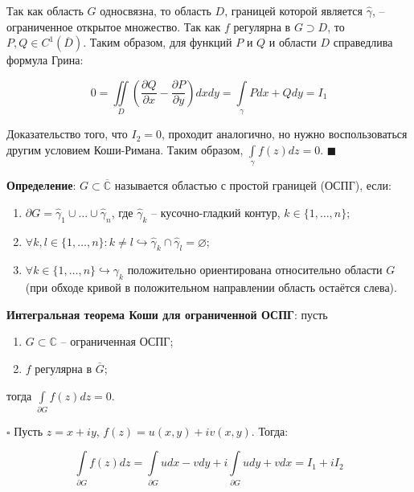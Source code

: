 \documentclass[12pt, a4paper, reqno]{article}
\begin{document}
    Так как область $G$ односвязна, то область $D$, границей которой является $\hat{\gamma}$, --
    ограниченное открытое множество. Так как $f$ регулярна в $G \supset D$, то
    $P, Q \in C^1(\overline{D})$. Таким образом, для функций $P$ и $Q$ и области $D$ справедлива
    формула Грина:

    \begin{equation*}
        0 = \iint\limits_{D} \left(\frac{\partial Q}{\partial x} - \frac{\partial P}{\partial y}\right) dx dy=
        \int\limits_{\gamma} Pdx + Qdy = I_1
    \end{equation*}

    Доказательство того, что $I_2 = 0$, проходит аналогично, но нужно воспользоваться другим
    условием Коши-Римана. Таким образом, $\int\limits_{\gamma} f(z)dz = 0$. $\blacksquare$

    \textbf{Определение}: $G \subset \overline{\mathbb{C}}$ называется областью с простой границей
    (ОСПГ), если:
    \begin{enumerate}
        \item $\partial G = \hat{\gamma}_1 \cup \ldots \cup \hat{\gamma}_n$, где $\hat{\gamma}_k$ --
              кусочно-гладкий контур, $k \in \{1, \ldots, n\}$;
        \item $\forall k, l \in \{1, \ldots, n\} : k \neq l \hookrightarrow
               \hat{\gamma}_k \cap \hat{\gamma}_l = \varnothing$;
        \item $\forall k \in \{1, \ldots, n\} \hookrightarrow \gamma_k$ положительно ориентирована
              относительно области $G$ (при обходе кривой в положительном направлении область
              остаётся слева).
    \end{enumerate}

    \textbf{Интегральная теорема Коши для ограниченной ОСПГ}: пусть
    \begin{enumerate}
        \item $G \subset \mathbb{C}$ -- ограниченная ОСПГ;
        \item $f$ регулярна в $\overline{G}$;
    \end{enumerate}
    тогда $\int\limits_{\partial G} f(z)dz = 0$.

    $\square$ Пусть $z = x + iy$, $f(z) = u(x, y) + iv(x, y)$. Тогда:

    \begin{equation*}
        \int\limits_{\partial G} f(z)dz =
        \int\limits_{\partial G} udx - vdy + i \int\limits_{\partial G} udy + vdx =
        I_1 + i I_2
    \end{equation*}
\end{document}
